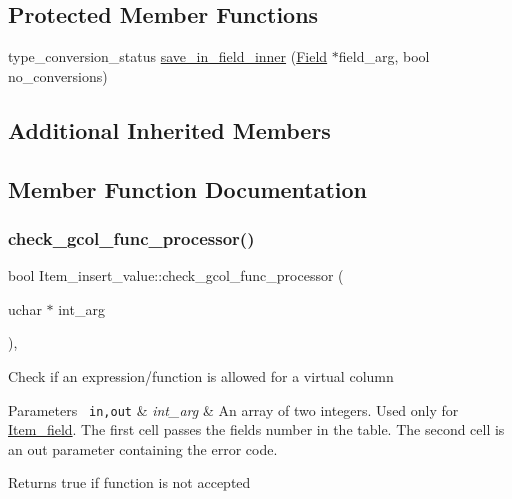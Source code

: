 \subsection*{Protected Member Functions}
\begin{DoxyCompactItemize}
\item 
type\+\_\+conversion\+\_\+status \mbox{\hyperlink{classItem__insert__value_a66064a4540fb76d611f806c195c40886}{save\+\_\+in\+\_\+field\+\_\+inner}} (\mbox{\hyperlink{classField}{Field}} $\ast$field\+\_\+arg, bool no\+\_\+conversions)
\end{DoxyCompactItemize}
\subsection*{Additional Inherited Members}


\subsection{Member Function Documentation}
\mbox{\label{classItem__insert__value_a6c64934ac5862b0e211f15e347a0a940}} 
\subsubsection{\texorpdfstring{check\+\_\+gcol\+\_\+func\+\_\+processor()}{check\_gcol\_func\_processor()}}
{\footnotesize\ttfamily bool Item\+\_\+insert\+\_\+value\+::check\+\_\+gcol\+\_\+func\+\_\+processor (\begin{DoxyParamCaption}\item[{uchar $\ast$}]{int\+\_\+arg }\end{DoxyParamCaption})\hspace{0.3cm}{\ttfamily [inline]}, {\ttfamily [virtual]}}

Check if an expression/function is allowed for a virtual column


\begin{DoxyParams}[1]{Parameters}
\mbox{\texttt{ in,out}}  & {\em int\+\_\+arg} & An array of two integers. Used only for \mbox{\hyperlink{classItem__field}{Item\+\_\+field}}. The first cell passes the field\textquotesingle{}s number in the table. The second cell is an out parameter containing the error code.\\
\hline
\end{DoxyParams}
\begin{DoxyReturn}{Returns}
true if function is not accepted 
\end{DoxyReturn}


